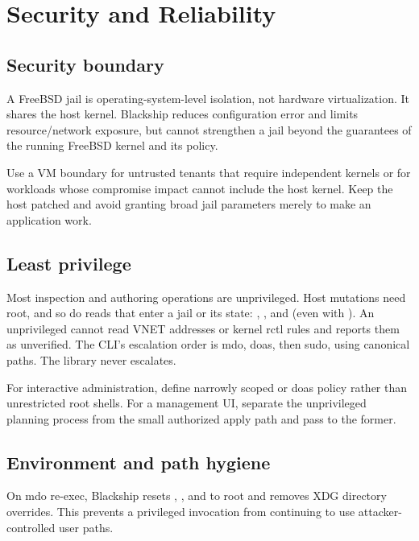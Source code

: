 \chapter{Security and Reliability}
\label{ch:security}

\section{Security boundary}

A FreeBSD jail is operating-system-level isolation, not hardware virtualization.
It shares the host kernel. Blackship reduces configuration error and limits
resource/network exposure, but cannot strengthen a jail beyond the guarantees
of the running FreeBSD kernel and its policy.

Use a VM boundary for untrusted tenants that require independent kernels or for
workloads whose compromise impact cannot include the host kernel. Keep the host
patched and avoid granting broad jail parameters merely to make an application
work.

\section{Least privilege}

Most inspection and authoring operations are unprivileged. Host mutations need
root, and so do reads that enter a jail or its state: ,
, and  (even with ). An
unprivileged  cannot read VNET addresses or kernel
rctl rules and reports them as unverified. The CLI's escalation order is mdo, doas, then sudo, using canonical paths.
The library never escalates.

For interactive administration, define narrowly scoped  or
doas policy rather than unrestricted root shells. For a management UI, separate
the unprivileged planning process from the small authorized apply path and pass
 to the former.

\section{Environment and path hygiene}

On mdo re-exec, Blackship resets , , and
 to root and removes XDG directory overrides. This prevents a
privileged invocation from continuing to use attacker-controlled user paths.

